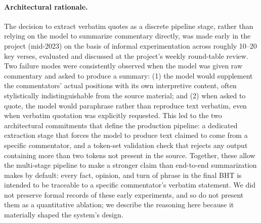 \paragraph{Architectural rationale.}
The decision to extract verbatim quotes as a discrete pipeline stage, rather than relying on the model to summarize commentary directly, was made early in the project (mid-2023) on the basis of informal experimentation across roughly 10--20 key verses, evaluated and discussed at the project's weekly round-table review. Two failure modes were consistently observed when the model was given raw commentary and asked to produce a summary: (1) the model would supplement the commentators' actual positions with its own interpretive content, often stylistically indistinguishable from the source material; and (2) when asked to quote, the model would paraphrase rather than reproduce text verbatim, even when verbatim quotation was explicitly requested. This led to the two architectural commitments that define the production pipeline: a dedicated extraction stage that forces the model to produce text claimed to come from a specific commentator, and a token-set validation check that rejects any output containing more than two tokens not present in the source. Together, these allow the multi-stage pipeline to make a stronger claim than end-to-end summarization makes by default: every fact, opinion, and turn of phrase in the final BHT is intended to be traceable to a specific commentator's verbatim statement. We did not preserve formal records of these early experiments, and so do not present them as a quantitative ablation; we describe the reasoning here because it materially shaped the system's design.

